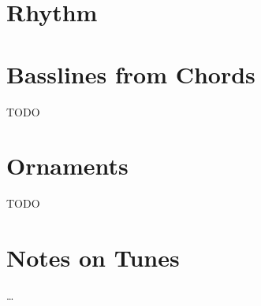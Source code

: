 
\section{Rhythm}
\begin{center}
\end{center}

\begin{center}
\end{center}

\section{Basslines from Chords}
TODO

\section{Ornaments}
TODO

\section{Notes on Tunes}
\begin{description}[noitemsep]
\item[TODO] \dots
\end{description}


